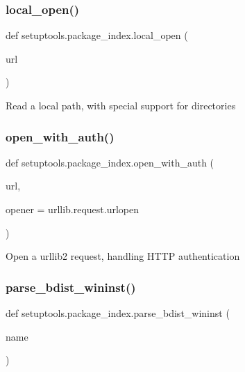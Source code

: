 \subsubsection{\texorpdfstring{local\+\_\+open()}{local\_open()}}
{\footnotesize\ttfamily def setuptools.\+package\+\_\+index.\+local\+\_\+open (\begin{DoxyParamCaption}\item[{}]{url }\end{DoxyParamCaption})}

\begin{DoxyVerb}Read a local path, with special support for directories\end{DoxyVerb}
 \mbox{\label{namespacesetuptools_1_1package__index_a7c5c00cd960eeda8764cb89731fca84a}} 
\subsubsection{\texorpdfstring{open\+\_\+with\+\_\+auth()}{open\_with\_auth()}}
{\footnotesize\ttfamily def setuptools.\+package\+\_\+index.\+open\+\_\+with\+\_\+auth (\begin{DoxyParamCaption}\item[{}]{url,  }\item[{}]{opener = {\ttfamily urllib.request.urlopen} }\end{DoxyParamCaption})}

\begin{DoxyVerb}Open a urllib2 request, handling HTTP authentication\end{DoxyVerb}
 \mbox{\label{namespacesetuptools_1_1package__index_a1deaaf84d6a8d1999a621f201f9df971}} 
\subsubsection{\texorpdfstring{parse\+\_\+bdist\+\_\+wininst()}{parse\_bdist\_wininst()}}
{\footnotesize\ttfamily def setuptools.\+package\+\_\+index.\+parse\+\_\+bdist\+\_\+wininst (\begin{DoxyParamCaption}\item[{}]{name }\end{DoxyParamCaption})}

